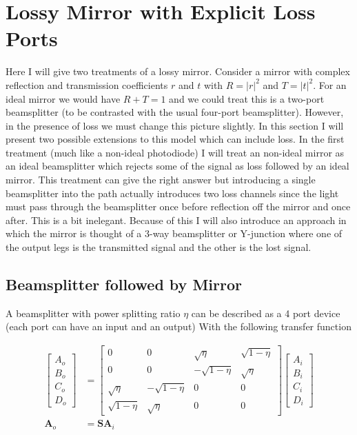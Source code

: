 \documentclass[12pt]{article}
\newcommand{\bv}[1]{\boldsymbol{#1}}
\begin{document}
\section{Lossy Mirror with Explicit Loss Ports}

Here I will give two treatments of a lossy mirror. Consider a mirror with complex reflection and transmission coefficients $r$ and $t$ with $R = |r|^2$ and $T = |t|^2$. For an ideal mirror we would have $R + T = 1$ and we could treat this is a two-port beamsplitter (to be contrasted with the usual four-port beamsplitter). However, in the presence of loss we must change this picture slightly. In this section I will present two possible extensions to this model which can include loss. In the first treatment (much like a non-ideal photodiode) I will treat an non-ideal mirror as an ideal beamsplitter which rejects some of the signal as loss followed by an ideal mirror. This treatment can give the right answer but introducing a single beamsplitter into the path actually introduces two loss channels since the light must pass through the beamsplitter once before reflection off the mirror and once after. This is a bit inelegant. Because of this I will also introduce an approach in which the mirror is thought of a 3-way beamsplitter or Y-junction where one of the output legs is the transmitted signal and the other is the lost signal.

\subsection{Beamsplitter followed by Mirror}

A beamsplitter with power splitting ratio $\eta$ can be described as a 4 port device (each port can have an input and an output) With the following transfer function

\begin{align}
\begin{bmatrix}
A_o\\ B_o\\ C_o\\ D_o
\end{bmatrix}
&=
\begin{bmatrix}
0 & 0 & \sqrt{\eta} & \sqrt{1-\eta}\\
0 & 0 & -\sqrt{1-\eta} & \sqrt{\eta}\\
\sqrt{\eta} & -\sqrt{1-\eta} & 0 & 0\\
\sqrt{1-\eta} & \sqrt{\eta} & 0 & 0
\end{bmatrix}
\begin{bmatrix}
A_i\\ B_i\\ C_i\\ D_i
\end{bmatrix}\\
\bv{A}_o &= \bv{S} \bv{A}_i
\end{align}
\end{document}
